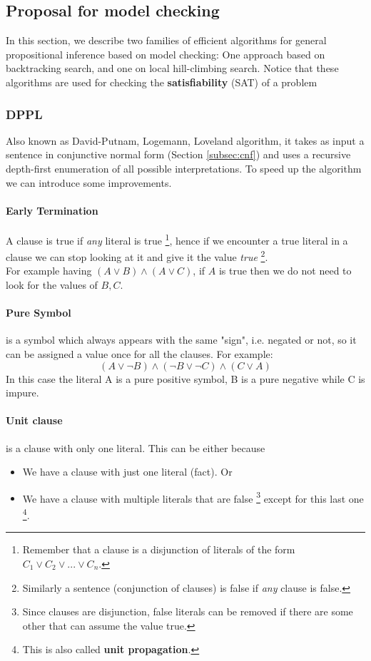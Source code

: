 \documentclass[10pt,a4paper]{article}
\begin{document}
\subsection{Proposal for model checking}
\label{subsec:search_alg}
In this section, we describe two families of efficient algorithms for general propositional inference based on model checking: One approach based on backtracking search, and one on local hill-climbing search. Notice that these algorithms are used for checking the \textbf{satisfiability} (SAT) of a problem

\subsubsection{DPPL}
Also known as David-Putnam, Logemann, Loveland algorithm, it takes as input a sentence in conjunctive normal form (Section \ref{subsec:cnf}) and uses a recursive depth-first enumeration of all possible interpretations. To speed up the algorithm we can introduce some improvements.

\paragraph{Early Termination} A clause is true if \textit{any} literal is true \footnote{Remember that a clause is a disjunction of literals of the form $C_1\vee C_2\vee...\vee C_n$.}, hence if we encounter a true literal in a clause we can stop looking at it and give it the value \textit{true} \footnote{Similarly a sentence (conjunction of clauses) is false if \textit{any} clause is false.}.\\
For example having $(A\vee B)\wedge(A \vee C)$, if $A$ is true then we do not need to look for the values of $B,C$.

\paragraph{Pure Symbol} is a symbol which always appears with the same "sign", i.e. negated or not, so it can be assigned a value once for all the clauses.
For example:
\[(A\vee\neg B)\wedge (\neg B \vee \neg C)\wedge(C \vee A)\]
In this case the literal A is a pure positive symbol, B is a pure negative while C is impure.

\paragraph{Unit clause} is a clause with only one literal. This can be either because
\begin{itemize}
\item We have a clause with just one literal (fact). Or
\item We have a clause with multiple literals that are false \footnote{Since clauses are disjunction, false literals can be removed if there are some other that can assume the value true.} except for this last one \footnote{This is also called \textbf{unit propagation}.}.
\end{itemize}
\end{document}
